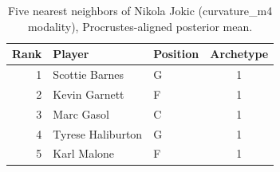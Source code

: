 \begin{table}[htbp]
  \centering\small
  \begin{tabular}{rllc}
    \toprule
    Rank & Player & Position & Archetype \\
    \midrule
    1 & Scottie Barnes & G & 1 \\
    2 & Kevin Garnett & F & 1 \\
    3 & Marc Gasol & C & 1 \\
    4 & Tyrese Haliburton & G & 1 \\
    5 & Karl Malone & F & 1 \\
    \bottomrule
  \end{tabular}
  \caption{Five nearest neighbors of Nikola Jokic (curvature_m4 modality), Procrustes-aligned posterior mean.}
  \label{tab:Nikola_Jokic_neighbors_curvature_m4}
\end{table}

